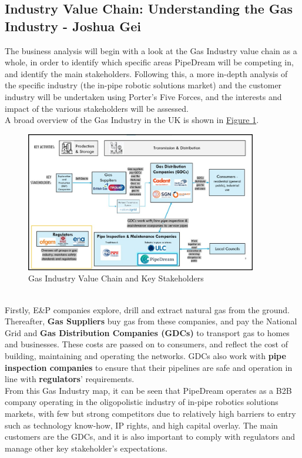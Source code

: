 \documentclass[11pt]{article}		%
\newcommand{\figref}[1]{\hyperref[#1]{Figure \ref*{#1}}}    %
\begin{document}
		\subsection[Industry Value Chain]{Industry Value Chain: Understanding the Gas Industry - Joshua Gei}\label{valueChainSection}
		
		The business analysis will begin with a look at the Gas Industry value chain as a whole, in order to identify which specific areas PipeDream will be competing in, and identify the main stakeholders. Following this, a more in-depth analysis of the specific industry (the in-pipe robotic solutions market) and the customer industry will be undertaken using Porter’s Five Forces, and the interests and impact of the various stakeholders will be assessed.
		\pagebreak
        \\
        \hspace*{2ex}A broad overview of the Gas Industry in the UK is shown in \figref{Industry Value Chain}.
		\begin{figure}[h]
				\centering
				\includegraphics[width=0.9\textwidth]{industryvaluechain.jpg}
				\caption{Gas Industry Value Chain and Key Stakeholders}
				\label{Industry Value Chain}
			\end{figure}
		\\
        \hspace*{2ex}Firstly, E\&P companies explore, drill and extract natural gas from the ground. Thereafter, \textbf{Gas Suppliers} buy gas from these companies, and pay the National Grid and \textbf{Gas Distribution Companies (GDCs)} to transport gas to homes and businesses. These costs are passed on to consumers, and reflect the cost of building, maintaining and operating the networks. GDCs also work with \textbf{pipe inspection companies} to ensure that their pipelines are safe and operation in line with \textbf{regulators}’ requirements. 
        \\
        \hspace*{2ex}From this Gas Industry map, it can be seen that PipeDream operates as a B2B company operating in the oligopolistic industry of in-pipe robotics solutions markets, with few but strong competitors due to relatively high barriers to entry such as technology know-how, IP rights, and high capital overlay. The main customers are the GDCs, and it is also important to comply with regulators and manage other key stakeholder's expectations. 
\end{document}
